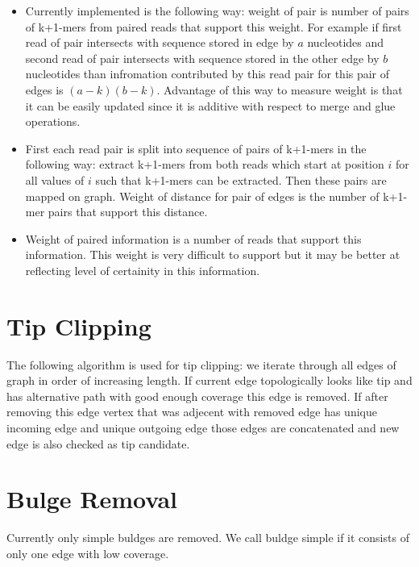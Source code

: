 \documentclass[14pt]{article}
\begin{document}
\begin{itemize}
\item Currently implemented is the following way: weight of pair is number of pairs of k+1-mers from paired reads that support this weight. For example if first read of pair intersects with sequence stored in edge by $a$ nucleotides and second read of pair intersects with sequence stored in the other edge by $b$ nucleotides than infromation contributed by this read pair for this pair of edges is $(a - k)(b - k)$. Advantage of this way to measure weight is that it can be easily updated since it is additive with respect to merge and glue operations.
\item First each read pair is split into sequence of pairs of k+1-mers in the following way: extract k+1-mers from both reads which start at position $i$ for all values of $i$ such that k+1-mers can be extracted. Then these pairs are mapped on graph. Weight of distance for pair of edges is the number of k+1-mer pairs that support this distance.
\item Weight of paired information is a number of reads that support this information. This weight is very difficult to support but it may be better at reflecting level of certainity in this information.
\end{itemize}


\section{Tip Clipping}

The following algorithm is used for tip clipping: we iterate through all edges of graph in order of increasing length. If current edge topologically looks like tip and has alternative path with good enough coverage this edge is removed. If after removing this edge vertex that was adjecent with removed edge has unique incoming edge and unique outgoing edge those edges are concatenated and new edge is also checked as tip candidate.

\section{Bulge Removal}

Currently only simple buldges are removed. We call buldge simple if it consists of only one edge with low coverage. 
\end{document}
